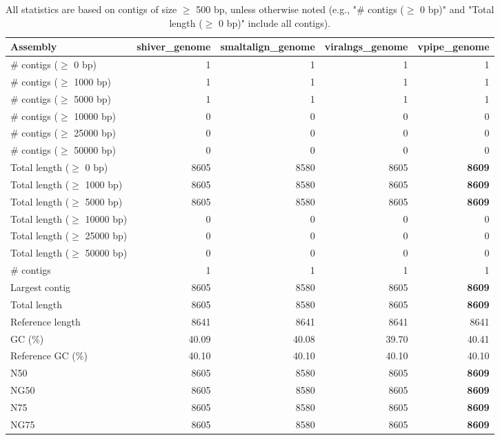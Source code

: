 \documentclass[12pt,a4paper]{article}
\begin{document}
\begin{table}[ht]
\begin{center}
\caption{All statistics are based on contigs of size $\geq$ 500 bp, unless otherwise noted (e.g., "\# contigs ($\geq$ 0 bp)" and "Total length ($\geq$ 0 bp)" include all contigs).}
\begin{tabular}{|l*{4}{|r}|}
\hline
Assembly & shiver\_genome & smaltalign\_genome & viralngs\_genome & vpipe\_genome \\ \hline
\# contigs ($\geq$ 0 bp) & 1 & 1 & 1 & 1 \\ \hline
\# contigs ($\geq$ 1000 bp) & 1 & 1 & 1 & 1 \\ \hline
\# contigs ($\geq$ 5000 bp) & 1 & 1 & 1 & 1 \\ \hline
\# contigs ($\geq$ 10000 bp) & 0 & 0 & 0 & 0 \\ \hline
\# contigs ($\geq$ 25000 bp) & 0 & 0 & 0 & 0 \\ \hline
\# contigs ($\geq$ 50000 bp) & 0 & 0 & 0 & 0 \\ \hline
Total length ($\geq$ 0 bp) & 8605 & 8580 & 8605 & {\bf 8609} \\ \hline
Total length ($\geq$ 1000 bp) & 8605 & 8580 & 8605 & {\bf 8609} \\ \hline
Total length ($\geq$ 5000 bp) & 8605 & 8580 & 8605 & {\bf 8609} \\ \hline
Total length ($\geq$ 10000 bp) & 0 & 0 & 0 & 0 \\ \hline
Total length ($\geq$ 25000 bp) & 0 & 0 & 0 & 0 \\ \hline
Total length ($\geq$ 50000 bp) & 0 & 0 & 0 & 0 \\ \hline
\# contigs & 1 & 1 & 1 & 1 \\ \hline
Largest contig & 8605 & 8580 & 8605 & {\bf 8609} \\ \hline
Total length & 8605 & 8580 & 8605 & {\bf 8609} \\ \hline
Reference length & 8641 & 8641 & 8641 & 8641 \\ \hline
GC (\%) & 40.09 & 40.08 & 39.70 & 40.41 \\ \hline
Reference GC (\%) & 40.10 & 40.10 & 40.10 & 40.10 \\ \hline
N50 & 8605 & 8580 & 8605 & {\bf 8609} \\ \hline
NG50 & 8605 & 8580 & 8605 & {\bf 8609} \\ \hline
N75 & 8605 & 8580 & 8605 & {\bf 8609} \\ \hline
NG75 & 8605 & 8580 & 8605 & {\bf 8609} \\ \hline

\end{tabular}
\end{center}
\end{table}
\end{document}
